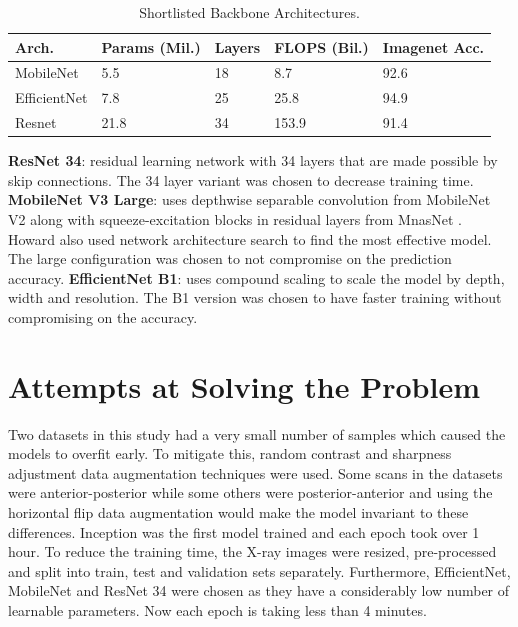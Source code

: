 \documentclass[10pt,twocolumn,letterpaper]{article}
\begin{document}
\begin{table}
  \centering
  \begin{tabular}{p{1.7cm}|p{1cm}|p{1cm}|p{1cm}|p{1cm}}
  \toprule
  Arch. & Params (Mil.) & Layers & FLOPS (Bil.) & Imagenet Acc.\\
  \midrule
  MobileNet & 5.5 & 18 & 8.7 & 92.6\\
  \midrule
  EfficientNet & 7.8 & 25 & 25.8 & 94.9\\
  \midrule
  Resnet & 21.8 & 34 & 153.9 & 91.4\\
  \bottomrule
  \end{tabular}
  \caption{Shortlisted Backbone Architectures.}
  \vspace{-1em}
  \label{tab:selArch}
\end{table}
\textbf{ResNet 34}: residual learning network with 34 layers that are made possible by skip connections. The 34 layer variant was chosen to decrease training time. \cite{he2016deep}
\textbf{MobileNet V3 Large}: uses depthwise separable convolution from MobileNet V2 \cite{sandler2018mobilenetv2} along with squeeze-excitation blocks in residual layers from MnasNet \cite{tan2019mnasnet}. Howard \etal \cite{howard2019searching} also used network architecture search to find the most effective model. The large configuration was chosen to not compromise on the prediction accuracy.
\textbf{EfficientNet B1}: uses compound scaling to scale the model by depth, width and resolution. The B1 version was chosen to have faster training without compromising on the accuracy. \cite{tan2019efficientnet}
\section{Attempts at Solving the Problem} 
\label{sec:method}
Two datasets in this study had a very small number of samples which caused the models to overfit early. To mitigate this, random contrast and sharpness adjustment \cite{nanni2021comparison} data augmentation techniques were used. Some scans in the datasets were anterior-posterior while some others were posterior-anterior and using the horizontal flip data augmentation would make the model invariant to these differences\cite{botev2022regularising}.
Inception was the first model trained and each epoch took over 1 hour. To reduce the training time, the X-ray images were resized, pre-processed and split into train, test and validation sets separately. Furthermore, EfficientNet, MobileNet and ResNet 34 were chosen as they have a considerably low number of learnable parameters. Now each epoch is taking less than 4 minutes. 
\end{document}
